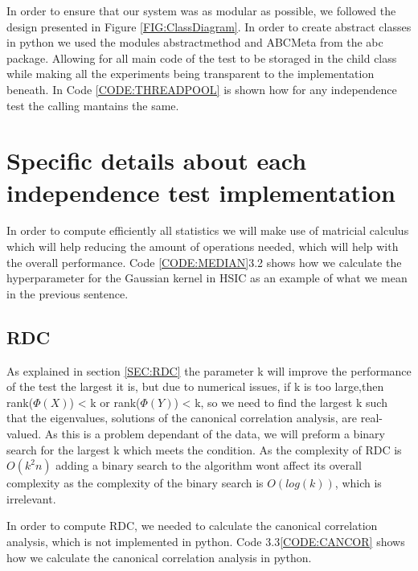 In order to ensure that our system was as modular as possible, we followed the design presented in Figure \ref{FIG:ClassDiagram}. In order to create abstract classes in python we used the modules abstractmethod and ABCMeta from the abc package. Allowing for all main code of the test to be storaged in the child class while making all the experiments being transparent to the implementation beneath. In Code  \ref{CODE:THREADPOOL} is shown how for any independence test the calling mantains the same.

\section{Specific details about each independence test implementation}

In order to compute efficiently all statistics we will make use of matricial calculus which will help reducing the amount of operations needed, which will help with the overall performance. Code \ref{CODE:MEDIAN}3.2 shows how we calculate the hyperparameter for the Gaussian kernel in HSIC as an example of what we mean in the previous sentence.

\label{CODE:MEDIAN}

\subsection{RDC}

As explained in section \ref{SEC:RDC} the parameter k will improve the performance of the test the largest it is, but due to numerical issues, if k is too large,then rank($\Phi(X)$) < k or rank($\Phi(Y)$) < k, so we need to find the largest k such that the eigenvalues, solutions of the canonical correlation analysis,  are real-valued. As this is a problem dependant of the data, we will preform a binary search for the largest k which meets the condition. As the complexity of RDC is $O(k^{2}n)$ adding a binary search to the algorithm wont affect its overall complexity as the complexity of the binary search is $O(log(k))$, which is irrelevant.

In order to compute RDC, we needed to calculate the canonical correlation analysis, which is not implemented in python. Code 3.3\ref{CODE:CANCOR} shows how we calculate the canonical correlation analysis in python.

\label{CODE:CANCOR}





